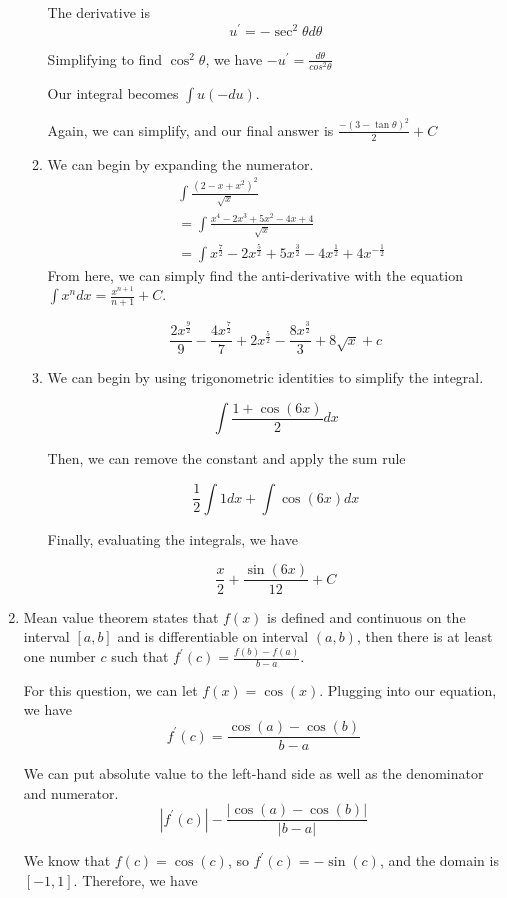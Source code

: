 \documentclass[11pt, letterpaper, twoside]{article}
\begin{document}
\begin{enumerate}
\begin{enumerate}[label=\alph*)]
The derivative is 
\[u^\prime=-\sec^2\theta d\theta\]

Simplifying to find \(\cos^2\theta\), we have \(-u^\prime=\frac{d\theta}{cos^2\theta}\)

Our integral becomes \(\int u (-du)\). 

Again, we can simplify, and our final answer is \(\boxed{\frac{-(3-\tan\theta)^2}{2}+C}\)

\item We can begin by expanding the numerator.
\begin{align*}
&\int\frac{(2-x+x^2)^2}{\sqrt x}\\
&=\int\frac{x^4-2x^3+5x^2-4x+4}{\sqrt x}\\
&=\int x^{\frac{7}{2}}-2x^{\frac{5}{2}}+5x^{\frac{3}{2}}-4x^{\frac{1}{2}}+4x^{-\frac{1}{2}}
\end{align*}
From here, we can simply find the anti-derivative with the equation \(\int x^ndx=\frac{x^{n+1}}{n+1}+C\).

\[\boxed{\frac{2x^{\frac{9}{2}}}{9}-\frac{4x^{\frac{7}{2}}}{7}+2x^{\frac{5}{2}}-\frac{8x^{\frac{3}{2}}}{3}+8\sqrt x+c}\]

\item We can begin by using trigonometric identities to simplify the integral.

\[\int\frac{1+\cos(6x)}{2}dx\]

Then, we can remove the constant and apply the sum rule

\[\frac{1}{2}\int 1dx + \int \cos(6x)dx\]

Finally, evaluating the integrals, we have 

\[\boxed{\frac{x}{2}+\frac{\sin(6x)}{12}+C}\]
\end{enumerate}
\item %
Mean value theorem states that \(f(x)\) is defined and continuous on the interval \([a, b]\) and is differentiable on interval \((a,b)\),
then there is at least one number \(c\) such that \(f^\prime(c)=\frac{f(b)-f(a)}{b-a}\).

For this question, we can let \(f(x)=\cos(x)\). 
Plugging into our equation, we have 
\[f^\prime(c)=\frac{\cos(a)-\cos(b)}{b-a}\]

We can put absolute value to the left-hand side as well as the denominator and numerator.
\[|f^\prime(c)|-\frac{|\cos(a)-\cos(b)|}{|b-a|}\]

We know that \(f(c)=\cos(c)\), so \(f^\prime(c)=-\sin(c)\), and the domain is \([-1, 1]\).
Therefore, we have 


\end{enumerate}
\end{document}
